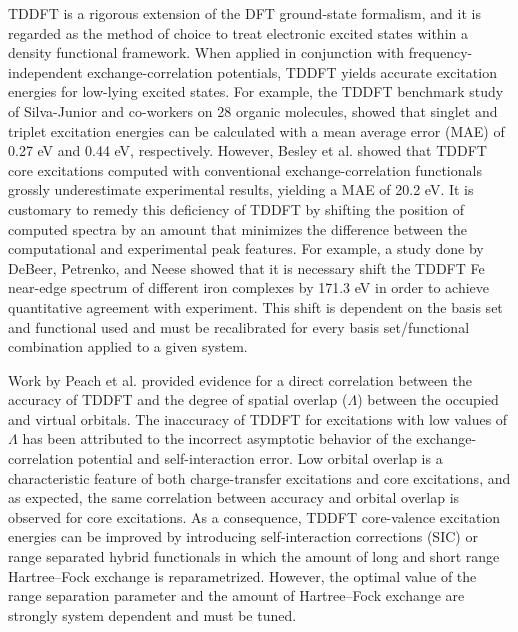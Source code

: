 \documentclass[8.5pt,twoside,twocolumn]{article}
\begin{document}
TDDFT is a rigorous extension of the DFT ground-state formalism,\cite{runge_density-functional_1984} and it is regarded as the method of choice to treat electronic excited states within a density functional framework.
 When applied in conjunction with frequency-independent exchange-correlation potentials, TDDFT yields accurate excitation energies for low-lying excited states. For example, the TDDFT benchmark study of Silva-Junior and co-workers\cite{silva-junior_benchmarks_2008} on 28 organic molecules, showed that singlet and triplet excitation energies can be calculated with a mean average error (MAE) of 0.27 eV and 0.44 eV, respectively. However, Besley et al.\cite{besley_self-consistent-field_2009} showed that TDDFT core excitations computed with conventional exchange-correlation functionals grossly underestimate experimental results, yielding a MAE of 20.2 eV. It is customary to remedy this deficiency of TDDFT by shifting the position of computed spectra by an amount that minimizes the difference between the computational and experimental peak features. For example, a study done by DeBeer, Petrenko, and Neese\cite{debeer_george_prediction_2008} showed that it is necessary shift the TDDFT Fe near-edge spectrum of different iron complexes by 171.3 eV in order to achieve quantitative agreement with experiment. This shift is dependent on the basis set and functional used and must be recalibrated for every basis set/functional combination applied to a given system.

Work by Peach et al.\cite{peach_excitation_2008} provided evidence for a direct correlation between the accuracy of TDDFT and the degree of spatial overlap ($\Lambda$) between the occupied and virtual orbitals.
The inaccuracy of TDDFT for excitations with low values of $\Lambda$ has been attributed to the incorrect asymptotic behavior of the exchange-correlation potential and self-interaction error.\cite{peach_excitation_2008} Low orbital overlap is a characteristic feature of both charge-transfer excitations and core excitations, and as expected, the same correlation between accuracy and orbital overlap is observed for core excitations.\cite{besley_time-dependent_2009}
As a consequence, TDDFT core-valence excitation energies can be improved by introducing self-interaction corrections (SIC)\cite{tu_core_2007} or range separated hybrid functionals in which the amount of long and short range Hartree--Fock exchange is reparametrized.\cite{besley_time-dependent_2009, nakata_time-dependent_2006}  However, the optimal value of the range separation parameter and the amount of Hartree--Fock exchange are strongly system dependent and must be tuned.\cite{capano_role_2013,besley_time-dependent_2007,besley_time-dependent_2010}
\end{document}
